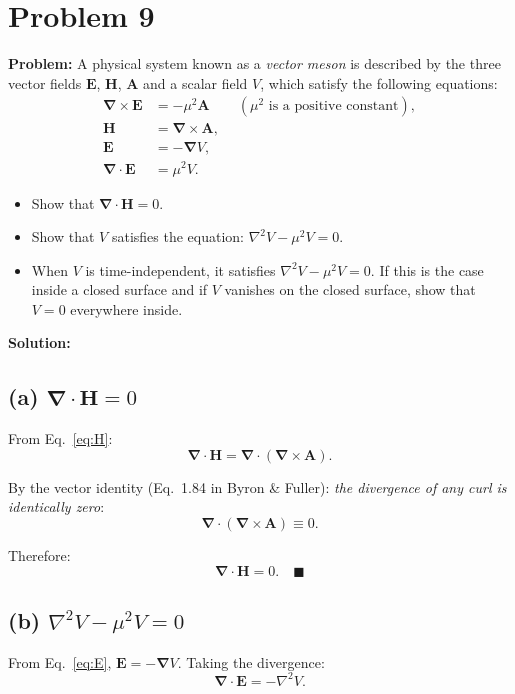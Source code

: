 \documentclass[12pt]{article}
\newcommand{\vect}[1]{\mathbf{#1}}
\newcommand{\grad}{\boldsymbol{\nabla}}
\newcommand{\curl}{\grad\times}
\newcommand{\divr}{\grad\cdot}
\begin{document}
\section*{Problem 9}

\textbf{Problem:} A physical system known as a \emph{vector meson} is described by the three vector fields $\vect{E}$, $\vect{H}$, $\vect{A}$ and a scalar field $V$, which satisfy the following equations:
\begin{align}
\curl\vect{E} &= -\mu^2\vect{A} \qquad (\mu^2 \text{ is a positive constant}), \label{eq:curlE} \\
\vect{H} &= \curl\vect{A}, \label{eq:H} \\
\vect{E} &= -\grad V, \label{eq:E} \\
\divr\vect{E} &= \mu^2 V. \label{eq:divE}
\end{align}

\begin{itemize}
\item[(a)] Show that $\divr\vect{H} = 0$.
\item[(b)] Show that $V$ satisfies the equation: $\nabla^2 V - \mu^2 V = 0$.
\item[(c)] When $V$ is time-independent, it satisfies $\nabla^2 V - \mu^2 V = 0$. If this is the case inside a closed surface and if $V$ vanishes on the closed surface, show that $V = 0$ everywhere inside.
\end{itemize}

\bigskip
\textbf{Solution:}

\subsection*{(a) $\divr\vect{H} = 0$}

From Eq.~\eqref{eq:H}:
\[
\divr\vect{H} = \divr(\curl\vect{A}).
\]

By the vector identity (Eq.~1.84 in Byron \& Fuller): \emph{the divergence of any curl is identically zero}:
\[
\divr(\curl\vect{A}) \equiv 0.
\]

Therefore:
\[
\boxed{\divr\vect{H} = 0}. \quad \blacksquare
\]

\subsection*{(b) $\nabla^2 V - \mu^2 V = 0$}

From Eq.~\eqref{eq:E}, $\vect{E} = -\grad V$. Taking the divergence:
\[
\divr\vect{E} = -\nabla^2 V.
\]
\end{document}
